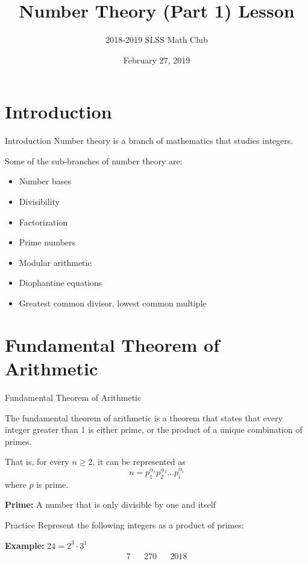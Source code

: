 \documentclass{beamer}
\title{Number Theory (Part 1) Lesson}
\author{2018-2019 SLSS Math Club}
\date{February 27, 2019}
\begin{document}
\frame{\titlepage}

\section{Introduction}
\begin{frame}{Introduction}
     Number theory is a branch of mathematics that studies integers. \newline

    Some of the sub-branches of number theory are:
    \begin{itemize}
        \item Number bases
        \item Divisibility
        \item Factorization 
        \item Prime numbers 
        \item Modular arithmetic
        \item Diophantine equations
        \item Greatest common divisor, lowest common multiple
    \end{itemize}
\end{frame}

\section{Fundamental Theorem of Arithmetic}
\begin{frame}{Fundamental Theorem of Arithmetic}
    
    The fundamental theorem of arithmetic is a theorem that states that every integer greater than 1 is either prime, or the product of a unique combination of primes. \newline
    
    That is, for every $n \geq 2$, it can be represented as $$n = p_1^{\alpha_1}p_2^{\alpha_2}\dots p_i^{\alpha_i}$$ where $p$ is prime. \newline
    
    \textbf{Prime:} A number that is only divisible by one and itself
\end{frame}

\begin{frame}{Practice}
    Represent the following integers as a product of primes: \newline
    
    \textbf{Example:} $24 = 2^3 \cdot 3^1$
    \begin{align*}
        7 && 270 && 2018
    \end{align*}
    
    \vspace{8em}
\end{frame}
\end{document}
